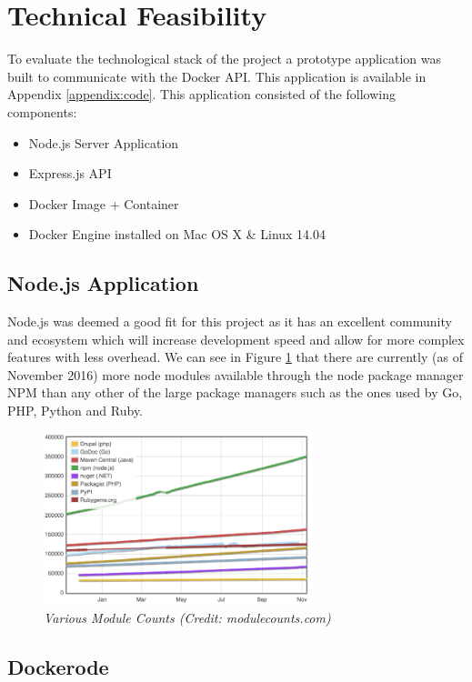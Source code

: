 \section{Technical Feasibility}
\label{sec:feasibility}
To evaluate the technological stack of the project a prototype application was built to communicate with the Docker API. This application is available in Appendix \ref{appendix:code}. This application consisted of the following components:

\begin{itemize}
  \item Node.js Server Application
  \item Express.js API
  \item Docker Image + Container
  \item Docker Engine installed on Mac OS X \& Linux 14.04 
\end{itemize}

\subsection{Node.js Application}
\label{sub:nodejs}

Node.js was deemed a good fit for this project as it has an excellent community and ecosystem which will increase development speed and allow for more complex features with less overhead. We can see in Figure \ref{fig:counts} that there are currently (as of November 2016) more node modules available through the node package manager NPM than any other of the large package managers such as the ones used by Go, PHP, Python and Ruby. 

\begin{figure}[!h]
\centering
\includegraphics*[width=0.7\textwidth]{images/module_counts}
\caption{\em Various Module Counts (Credit: modulecounts.com)}
\label{fig:counts}
\end{figure}

\subsection{Dockerode}
\label{sub:dockerode}


